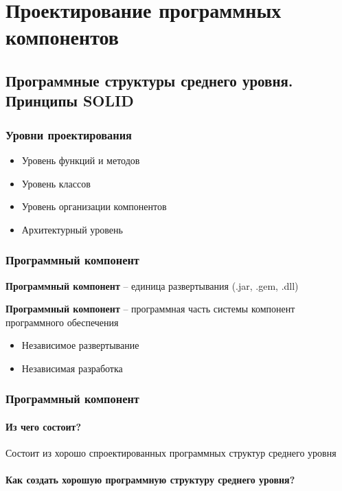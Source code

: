 \chapter{Проектирование программных компонентов}

\section{Программные структуры среднего уровня. Принципы SOLID}

\subsection{Уровни проектирования}

\begin{itemize}
    \item Уровень функций и методов
    \item Уровень классов
    \item Уровень организации компонентов
    \item Архитектурный уровень
\end{itemize}

\subsection{Программный компонент}

\textbf{Программный компонент} --
единица развертывания ({\ttfamily .jar, .gem, .dll})

\textbf{Программный компонент} --
программная часть системы компонент программного обеспечения

\begin{itemize}
    \item Независимое развертывание
    \item Независимая разработка
\end{itemize}

\subsection{Программный компонент}

\subsubsection{Из чего состоит?}

Состоит из хорошо спроектированных программных структур среднего уровня

\subsubsection{Как создать хорошую программную
структуру среднего уровня?}

